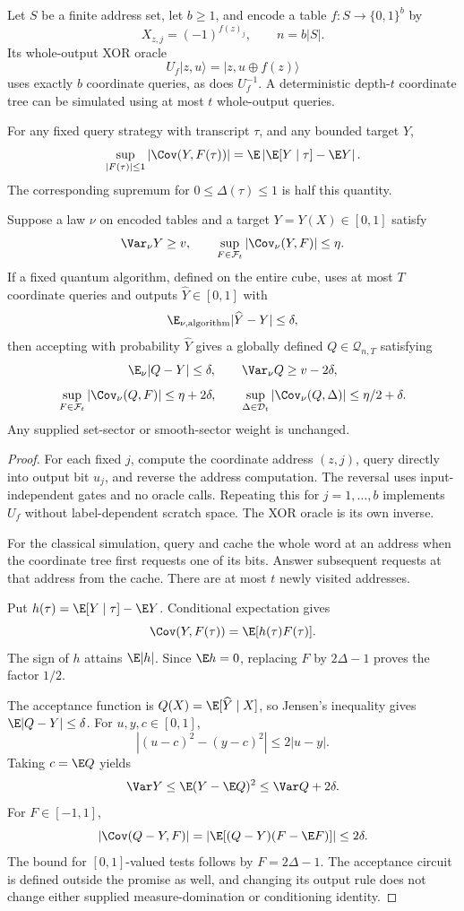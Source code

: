 \begin{lemma}\label{ian:period-hsp-compilation-tools}
Let \(S\) be a finite address set, let \(b\ge1\), and encode a table
\(f:S\to\{0,1\}^b\) by
\[
 X_{z,j}=(-1)^{f(z)_j},\qquad n=b|S|.
\]
Its whole-output XOR oracle
\[
 U_f|z,u\rangle=|z,u\oplus f(z)\rangle
\]
uses exactly \(b\) coordinate queries, as does \(U_f^{-1}\).
A deterministic depth-\(t\) coordinate tree can be simulated using at most \(t\) whole-output queries.

For any fixed query strategy with transcript \(\tau\), and any bounded target \(Y\),
\[
 \sup_{|F(\tau)|\le1}|\Cov(Y,F(\tau))|
 =
 \E\left|\E[Y\mid\tau]-\E Y\right|.
\]
The corresponding supremum for \(0\le\Delta(\tau)\le1\) is half this quantity.

Suppose a law \(\nu\) on encoded tables and a target \(Y=Y(X)\in[0,1]\) satisfy
\[
 \Var_\nu Y\ge v,\qquad
 \sup_{F\in\mathcal F_t}|\Cov_\nu(Y,F)|\le\eta.
\]
If a fixed quantum algorithm, defined on the entire cube, uses at most \(T\) coordinate queries and outputs \(\widehat Y\in[0,1]\) with
\[
 \E_{\nu,\mathrm{algorithm}}|\widehat Y-Y|\le\delta,
\]
then accepting with probability \(\widehat Y\) gives a globally defined
\(Q\in\mathcal Q_{n,T}\) satisfying
\[
 \E_\nu|Q-Y|\le\delta,\qquad
 \Var_\nu Q\ge v-2\delta,
\]
\[
 \sup_{F\in\mathcal F_t}|\Cov_\nu(Q,F)|\le\eta+2\delta,
 \qquad
 \sup_{\Delta\in\mathcal D_t}|\Cov_\nu(Q,\Delta)|\le\eta/2+\delta.
\]
Any supplied set-sector or smooth-sector weight is unchanged.
\end{lemma}

\begin{proof}
For each fixed \(j\), compute the coordinate address \((z,j)\), query directly into output bit \(u_j\), and reverse the address computation. The reversal uses input-independent gates and no oracle calls. Repeating this for \(j=1,\ldots,b\) implements \(U_f\) without label-dependent scratch space. The XOR oracle is its own inverse.

For the classical simulation, query and cache the whole word at an address when the coordinate tree first requests one of its bits. Answer subsequent requests at that address from the cache. There are at most \(t\) newly visited addresses.

Put \(h(\tau)=\E[Y\mid\tau]-\E Y\). Conditional expectation gives
\[
 \Cov(Y,F(\tau))=\E[h(\tau)F(\tau)].
\]
The sign of \(h\) attains \(\E|h|\). Since \(\E h=0\), replacing \(F\) by \(2\Delta-1\) proves the factor \(1/2\).

The acceptance function is
\(Q(X)=\E[\widehat Y\mid X]\), so Jensen's inequality gives
\(\E|Q-Y|\le\delta\).
For \(u,y,c\in[0,1]\),
\[
 |(u-c)^2-(y-c)^2|\le2|u-y|.
\]
Taking \(c=\E Q\) yields
\[
 \Var Y\le\E(Y-\E Q)^2\le\Var Q+2\delta.
\]
For \(F\in[-1,1]\),
\[
 |\Cov(Q-Y,F)|
 =|\E[(Q-Y)(F-\E F)]|
 \le2\delta.
\]
The bound for \([0,1]\)-valued tests follows by \(F=2\Delta-1\).
The acceptance circuit is defined outside the promise as well, and changing its output rule does not change either supplied measure-domination or conditioning identity.
\end{proof}

